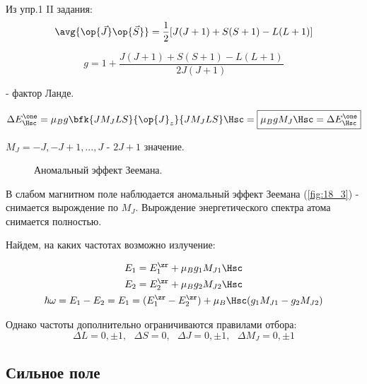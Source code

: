 Из упр.1 II задания:
$$
\avg{\op{\vec{J}} \op{\vec{S}}} = \frac{1}{2}[J(J+1) + S(S+1) - L(L + 1)]
$$

\begin{equation}
\label{eq:18_6_3}
\boxed{g = 1 + \frac{J(J+1) + S(S + 1) - L(L + 1)}{2J(J+1)}}
\end{equation}

- фактор Ланде.

\begin{equation}
\label{eq:18_6_4}
\Delta E_{\Hsc}^\one = \mu_B g \bfk{J M_J L S}{\op{J}_z}{J M_J L S} \Hsc = \boxed{\mu_B g M_J \Hsc = \Delta E_{\Hsc}^\one}
\end{equation}

$M_J = -J, -J + 1, ..., J$ - $2J+1$ значение.

\begin{figure}[h!]
\centering
{}
\caption{Аномальный эффект Зеемана.} \label{fig:18_3}
\end{figure}

В слабом магнитном поле наблюдается аномальный эффект Зеемана (\autoref{fig:18_3}) - снимается вырождение по $M_J$. Вырождение энергетического спектра атома снимается полностью.

Найдем, на каких частотах возможно излучение:

\begin{gather}
\label{eq:18_6_5}
E_1 = E_1^\zr + \mu_B g_1 M_{J1} \Hsc \nonumber \\
E_2 = E_2^\zr + \mu_B g_2 M_{J2} \Hsc \nonumber \\
\hbar \omega = E_1 - E_2 = E_1 = (E_1^\zr -E_2^\zr)  + \mu_B \Hsc (g_1 M_{J1}  - g_2 M_{J2})
\end{gather}

Однако частоты дополнительно ограничиваются правилами отбора:
$$
\boxed{\Delta L = 0, \pm 1,~~~ \Delta S = 0, ~~~\Delta J = 0, \pm 1, ~~~ \Delta M_J = 0, \pm 1 }
$$

\subsection{Сильное поле}

